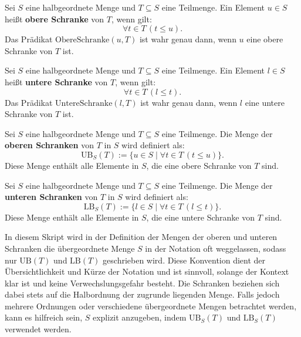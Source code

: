 \documentclass[main.tex]{subfiles}
\begin{document}
\begin{definition}
    Sei \( S \) eine halbgeordnete Menge und \( T \subseteq S \) eine Teilmenge. Ein Element \( u \in S \) heißt \textbf{obere Schranke} von \( T \), wenn gilt:
    \[
    \forall t \in T \, (t \leq u).
    \]
    Das Prädikat \(\text{ObereSchranke}(u, T)\) ist wahr genau dann, wenn \( u \) eine obere Schranke von \( T \) ist.
\end{definition}

\begin{definition}
    Sei \( S \) eine halbgeordnete Menge und \( T \subseteq S \) eine Teilmenge. Ein Element \( l \in S \) heißt \textbf{untere Schranke} von \( T \), wenn gilt:
    \[
    \forall t \in T \, (l \leq t).
    \]
    Das Prädikat \(\text{UntereSchranke}(l, T)\) ist wahr genau dann, wenn \( l \) eine untere Schranke von \( T \) ist.
\end{definition}

\begin{definition}
    Sei \( S \) eine halbgeordnete Menge und \( T \subseteq S \) eine Teilmenge. Die Menge der \textbf{oberen Schranken} von \( T \) in \( S \) wird definiert als:
    \[
    \text{UB}_S(T) := \{ u \in S \mid \forall t \in T \, (t \leq u) \}.
    \]
    Diese Menge enthält alle Elemente in \( S \), die eine obere Schranke von \( T \) sind.
\end{definition}

\begin{definition}
    Sei \( S \) eine halbgeordnete Menge und \( T \subseteq S \) eine Teilmenge. Die Menge der \textbf{unteren Schranken} von \( T \) in \( S \) wird definiert als:
    \[
    \text{LB}_S(T) := \{ l \in S \mid \forall t \in T \, (l \leq t) \}.
    \]
    Diese Menge enthält alle Elemente in \( S \), die eine untere Schranke von \( T \) sind.
\end{definition}
\begin{remark}
    In diesem Skript wird in der Definition der Mengen der oberen und unteren Schranken die übergeordnete Menge \( S \) in der Notation oft weggelassen, sodass nur \(\text{UB}(T)\) und \(\text{LB}(T)\) geschrieben wird. Diese Konvention dient der Übersichtlichkeit und Kürze der Notation und ist sinnvoll, solange der Kontext klar ist und keine Verwechslungsgefahr besteht. Die Schranken beziehen sich dabei stets auf die Halbordnung der zugrunde liegenden Menge. Falls jedoch mehrere Ordnungen oder verschiedene übergeordnete Mengen betrachtet werden, kann es hilfreich sein, \( S \) explizit anzugeben, indem \(\text{UB}_S(T)\) und \(\text{LB}_S(T)\) verwendet werden.
\end{remark}
\end{document}
